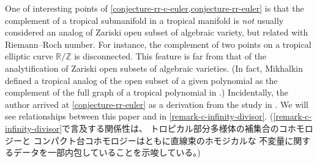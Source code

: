 \documentclass[a4paper,dvipdfmx,reqno,12pt]{amsart}
\theoremstyle{definition}
\numberwithin{equation}{section}
\begin{document}
One of interesting points of
\cref{conjecture-rr-c-euler,conjecture-rr-euler} is that
the complement of a tropical submanifold in
a tropical manifold is \emph{not} usually
considered an analog of Zariski open subset
of algebraic variety, but related with Riemann--Roch number.
For instance, the complement of two points 
on a tropical elliptic curve
$\mathbb{R}/\mathbb{Z}$ is disconnected.
This feature is far from that of the analytification of Zariski open subsets of
algebraic varieties.
(In fact, Mikhalkin defined
a tropical analog of the open subset of
a given polynomial as the complement of
the full graph \cite[]{MR2275625}
of a tropical polynomial in
\cite[Remark 3.5 and Example 3.6]{MR2275625}.)
Incidentally, the author arrived at
\cref{conjecture-rr-euler} as
a derivation from the study in
\cite{tsutsui2023graded}. 
We will see relationships between 
this paper and \cite{tsutsui2023graded}
in \cref{remark-c-infinity-divisor}.
(\cref{remark-c-infinity-divisor}で言及する関係性は、
トロピカル部分多様体の補集合のコホモロジーと
コンパクト台コホモロジーはともに直線束のホモジカルな
不変量に関するデータを一部内包していることを示唆している。)
\end{document}
